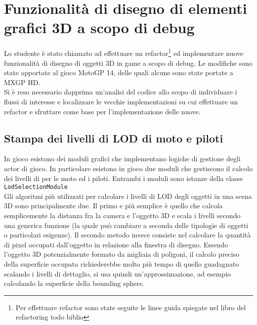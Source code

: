 
\chapter{Funzionalità di disegno di elementi grafici 3D a scopo di debug}
\label{cap:game}

Lo studente è stato chiamato ad effettuare un refactor\footnote{Per effettuare refactor sono state seguite le linee guida spiegate nel libro del refactoring todo biblio} ed implementare nuove funzionalità di disegno di oggetti 3D in game a scopo di debug. Le modifiche sono state apportate al gioco MotoGP 14, delle quali alcune sono state portate a MXGP HD.\\

Si è reso necessario dapprima un'analisi del codice allo scopo di individuare i flussi di interesse e localizzare le vecchie implementazioni su cui effettuare un refactor e sfruttare come base per l'implementazione delle nuove.\\

\section{Stampa dei livelli di LOD di moto e piloti}

In gioco esistono dei moduli grafici che implementano logiche di gestione degli actor di gioco. In particolare esistono in gioco due moduli che gestiscono il calcolo dei livelli di  per le moto ed i piloti. Entrambi i moduli sono istanze della classe \texttt{LodSelectionModule}\\

Gli algoritmi più utilizzati per calcolare i livelli di LOD degli oggetti in una scena 3D sono principalmente due. Il primo e più semplice è quello che calcola semplicemente la distanza fra la camera e l'oggetto 3D e scala i livelli secondo una generica funzione (la quale può cambiare a seconda delle tipologie di oggetti o particolari esigenze). Il secondo metodo invece consiste nel calcolare la quantità di pixel occupati dall'oggetto in relazione alla finestra di disegno. Essendo l'oggetto 3D potenzialmente formato da migliaia di poligoni, il calcolo preciso della superficie occupata richiederebbe molto più tempo di quello guadagnato scalando i livelli di dettaglio, si usa quindi un'approssimazione, ad esempio calcolando la superficie della bounding sphere.\\

